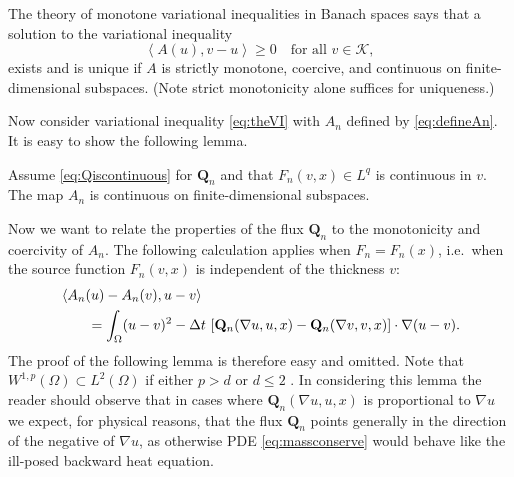 \documentclass[final,leqno,onefignum,onetabnum]{siamltex1213bueler}
\newcommand\bQ{\mathbf{Q}}
\renewcommand{\grad}{\nabla}
\newcommand{\ip}[2]{\ensuremath{\left<#1,#2\right>}}
\newcommand\RR{\mathbb{R}}
\begin{document}
The theory of monotone variational inequalities in Banach spaces \cite[chapter III]{KinderlehrerStampacchia1980} says that a solution to the variational inequality
\begin{equation}
    \ip{A(u)}{v-u} \ge 0 \quad \text{for all $v\in\mathcal{K}$}, \label{eq:VIabstract}
\end{equation}
exists and is unique if $A$ is strictly monotone, coercive, and continuous on finite-dimensional subspaces.  (Note strict monotonicity alone suffices for uniqueness.)

Now consider variational inequality \eqref{eq:theVI} with $A_n$ defined by \eqref{eq:defineAn}.  It is easy to show the following lemma.

\begin{lemma}  \label{lem:continuous}  Assume \eqref{eq:Qiscontinuous} for $\bQ_n$ and that $F_n(v,x)\in L^q$ is continuous in $v$.  The map $A_n$ is continuous on finite-dimensional subspaces.
\end{lemma}


Now we want to relate the properties of the flux $\bQ_n$ to the monotonicity and coercivity of $A_n$.  The following calculation applies when $F_n=F_n(x)$, i.e.~when the source function $F_n(v,x)$ is independent of the thickness $v$:
\begin{align}
   &\ip{A_n(u) - A_n(v)}{u-v}  \label{eq:AtoQcalculation} \\
   &\qquad = \int_\Omega (u-v)^2 - \Delta t\, \left[\bQ_n(\grad u,u,x) - \bQ_n(\grad v,v,x)\right] \cdot \grad(u-v).  \notag
\end{align}
The proof of the following lemma is therefore easy and omitted.  Note that $W^{1,p}(\Omega) \subset L^2(\Omega)$ if either $p>d$ or $d\le 2$ \cite[theorems 5.6.2 and 5.6.5]{Evans2010}.  %
In considering this lemma the reader should observe that in cases where $\bQ_n(\grad u,u,x)$ is proportional to $\grad u$ we expect, for physical reasons, that the flux $\bQ_n$ points generally in the direction of the negative of $\grad u$, as otherwise PDE \eqref{eq:massconserve} would behave like the ill-posed backward heat equation.
\end{document}
